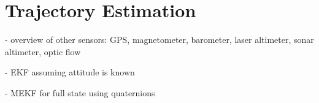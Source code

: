 \chapter{Trajectory Estimation}
\label{chap:trajectory_estimation}


- overview of other sensors: GPS, magnetometer, barometer, laser altimeter, sonar altimeter, optic flow

- EKF assuming attitude is known

- MEKF for full state using quaternions

